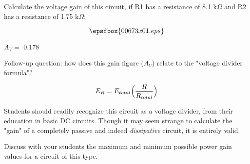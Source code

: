 

Calculate the voltage gain of this circuit, if R1 has a resistance of 8.1 k$\Omega$ and R2 has a resistance of 1.75 k$\Omega$:

$$\epsfbox{00673x01.eps}$$







$A_V =$ 0.178

\vskip 10pt

Follow-up question: how does this gain figure ($A_V$) relate to the "voltage divider formula"?

$$E_R = E_{total} \Bigl({R \over R_{total}}\Bigr)$$








Students should readily recognize this circuit as a voltage divider, from their education in basic DC circuits.  Though it may seem strange to calculate the "gain" of a completely passive and indeed {\it dissipative} circuit, it is entirely valid.

Discuss with your students the maximum and minimum possible power gain values for a circuit of this type.




